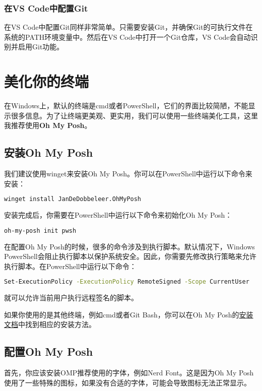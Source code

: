 \documentclass[../main.tex]{subfiles}
\begin{document}
\subsubsection{在VS Code中配置Git}

在VS Code中配置Git同样非常简单。只需要安装Git，并确保Git的可执行文件在系统的PATH环境变量中。然后在VS Code中打开一个Git仓库，VS Code会自动识别并启用Git功能。

\section{美化你的终端}

在Windows上，默认的终端是cmd或者PowerShell，它们的界面比较简陋，不能显示很多信息。为了让终端更美观、更实用，我们可以使用一些终端美化工具，这里我推荐使用\textbf{Oh My Posh}。

\subsection{安装Oh My Posh}

我们建议使用winget来安装Oh My Posh。你可以在PowerShell中运行以下命令来安装：

\begin{lstlisting}[language=bash]
  winget install JanDeDobbeleer.OhMyPosh
\end{lstlisting}

安装完成后，你需要在PowerShell中运行以下命令来初始化Oh My Posh：
\begin{lstlisting}[language=bash]
  oh-my-posh init pwsh
\end{lstlisting}

在配置Oh My Posh的时候，很多的命令涉及到执行脚本。默认情况下，Windows PowerShell会阻止执行脚本以保护系统安全。因此，你需要先修改执行策略来允许执行脚本。在PowerShell中运行以下命令：
\begin{lstlisting}[language=bash]
  Set-ExecutionPolicy -ExecutionPolicy RemoteSigned -Scope CurrentUser
\end{lstlisting}
就可以允许当前用户执行远程签名的脚本。

如果你使用的是其他终端，例如cmd或者Git Bash，你可以在Oh My Posh的\href{https://ohmyposh.dev/docs/installation}{安装文档}中找到相应的安装方法。

\subsection{配置Oh My Posh}

首先，你应该安装OMP推荐使用的字体，例如Nerd Font。这是因为Oh My Posh使用了一些特殊的图标，如果没有合适的字体，可能会导致图标无法正常显示。
\end{document}
